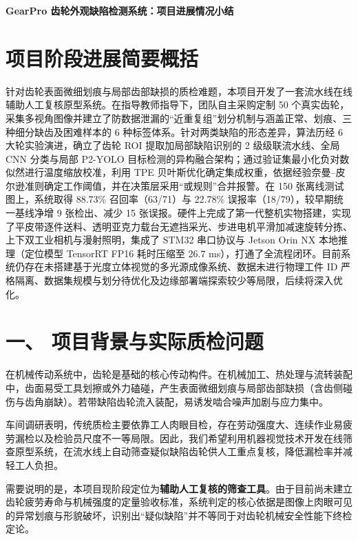 
\begin{center}
{\bfseries GearPro 齿轮外观缺陷检测系统：项目进展情况小结\par}
\end{center}

\section*{项目阶段进展简要概括}

针对齿轮表面微细划痕与局部齿部缺损的质检难题，本项目开发了一套流水线在线辅助人工复核原型系统。在指导教师指导下，团队自主采购定制 50 个真实齿轮，采集多视角图像并建立了防数据泄漏的“近重复组”划分机制与涵盖正常、划痕、三种细分缺齿及困难样本的 6 种标签体系。针对两类缺陷的形态差异，算法历经 6 大轮实验演进，确立了齿轮 ROI 提取加局部缺陷识别的 2 级级联流水线、全局 CNN 分类与局部 P2-YOLO 目标检测的异构融合架构；通过验证集最小化负对数似然进行温度缩放校准，利用 TPE 贝叶斯优化确定集成权重，依据经验奈曼–皮尔逊准则确定工作阈值，并在决策层采用“或规则”合并报警。在 150 张离线测试图上，系统取得 88.73\% 召回率（63/71）与 22.78\% 误报率（18/79），较早期统一基线净增 9 张检出、减少 15 张误报。硬件上完成了第一代整机实物搭建，实现了平皮带逐件送料、透明亚克力载台无遮挡采光、步进电机平滑加减速旋转分拣、上下双工业相机与漫射照明，集成了 STM32 串口协议与 Jetson Orin NX 本地推理（定位模型 TensorRT FP16 耗时压缩至 26.7 ms），打通了全流程闭环。目前系统仍存在未搭建基于光度立体视觉的多光源成像系统、数据未进行物理工件 ID 严格隔离、数据集规模与划分待优化及边缘部署端探索较少等局限，后续将深入优化。

\section*{一、 项目背景与实际质检问题}

在机械传动系统中，齿轮是基础的核心传动构件。在机械加工、热处理与流转装配中，齿面易受工具划擦或外力磕碰，产生表面微细划痕与局部齿部缺损（含齿侧碰伤与齿角崩缺）。若带缺陷齿轮流入装配，易诱发啮合噪声加剧与应力集中。

车间调研表明，传统质检主要依靠工人肉眼目检，存在劳动强度大、连续作业易疲劳漏检以及检验员尺度不一等局限。因此，我们希望利用机器视觉技术开发在线筛查原型系统，在流水线上自动筛查疑似缺陷齿轮供人工重点复核，降低漏检率并减轻工人负担。

需要说明的是，本项目现阶段定位为\textbf{辅助人工复核的筛查工具}。由于目前尚未建立齿轮疲劳寿命与机械强度的定量验收标准，系统判定的核心依据是图像上肉眼可见的异常划痕与形貌破坏，识别出“疑似缺陷”并不等同于对齿轮机械安全性能下终检定论。

